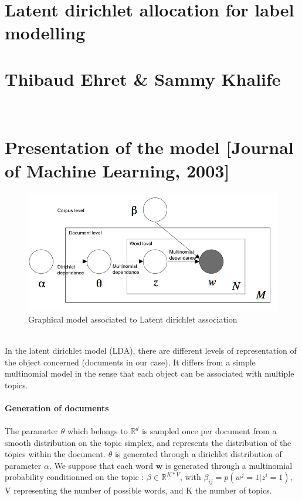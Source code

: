 \documentclass[12pt]{article}
\begin{document}
\section*{Latent dirichlet allocation for label modelling}
\section*{Thibaud Ehret \& Sammy Khalife}
~\\
\section*{Presentation of the model [Journal of Machine Learning, 2003]}
\begin{figure}[!h]
\centering
\captionsetup{justification=centering,margin=2cm}
\includegraphics[width=13cm]{LDA.png}
\caption{Graphical model associated to Latent dirichlet association}
\end{figure}
~\\
In the latent dirichlet model (LDA), there are different levels of representation of the object concerned (documents in our case). It differs from a simple multinomial model in the sense that each object can be associated with multiple topics. ~\\
~\\
\textbf{Generation of documents}~\\
~\\
The parameter $\theta$  which belongs to $\mathbb{R}^{d}$ is sampled once per document from a smooth distribution on the topic simplex, and represents the distribution of the topics within the document. $\theta$ is generated through a dirichlet distribution of parameter $\alpha$. We suppose that each word $\textbf{w}$ is generated through a multinomial probability conditionned on the topic : $\beta \in \mathbb{R}^{K*V}$, with $\beta_{ij}=p(w^{j}=1|z^{i}=1)$, V representing the number of possible words, and K the number of topics.
\end{document}
